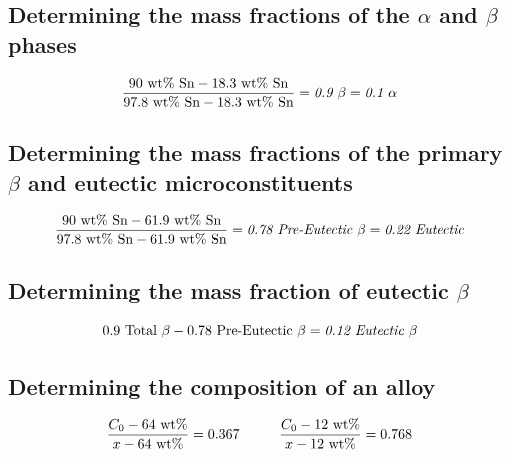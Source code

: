 \documentclass{article}
\begin{document}
\subsection*{Determining the mass fractions of the \(\alpha\) and \(\beta\) phases}
\[\frac{90 \textnormal{ wt\% Sn}-18.3 \textnormal{ wt\% Sn}}{97.8 \textnormal{ wt\% Sn}-18.3 \textnormal{ wt\% Sn}}=\textit{0.9 } \mathit{\beta}=\textit{0.1 } \mathit{\alpha}\]
\subsection*{Determining the mass fractions of the primary \(\beta\) and eutectic microconstituents}
\[\frac{90 \textnormal{ wt\% Sn}-61.9 \textnormal{ wt\% Sn}}{97.8 \textnormal{ wt\% Sn}-61.9 \textnormal{ wt\% Sn}}=\textit{0.78 Pre-Eutectic } \mathit{\beta}=\textit{0.22 Eutectic}\]
\subsection*{Determining the mass fraction of eutectic \(\beta\)}
\[0.9 \textnormal{ Total } \beta-0.78 \textnormal{ Pre-Eutectic } \beta=\textit{0.12 Eutectic } \mathit{\beta}\]
\subsection*{Determining the composition of an alloy}
\[\frac{C_0-64 \textnormal{ wt\%}}{x-64 \textnormal{ wt\%}}=0.367\hspace{10 mm}\frac{C_0-12 \textnormal{ wt\%}}{x-12 \textnormal{ wt\%}}=0.768\]
\end{document}
